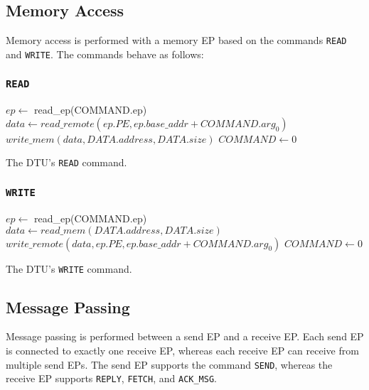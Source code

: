 \documentclass[a4paper,11pt,draft]{article}
\begin{document}
\subsection{Memory Access}

Memory access is performed with a memory EP based on the commands \texttt{READ} and \texttt{WRITE}. The commands behave as follows:

\subsubsection{\texttt{READ}}

\begin{algorithm}[H]
    $ep \gets$ read\_ep(COMMAND.ep)\;
    \BlankLine
    $data \gets read\_remote(ep.PE, ep.base\_addr + COMMAND.arg_0)$\;
    $write\_mem(data, DATA.address, DATA.size)$\;
    \BlankLine
    $COMMAND \gets 0$\;
    \caption{The DTU's \texttt{READ} command.}
\end{algorithm}

\subsubsection{\texttt{WRITE}}

\begin{algorithm}[H]
    $ep \gets$ read\_ep(COMMAND.ep)\;
    \BlankLine
    $data \gets read\_mem(DATA.address, DATA.size)$\;
    $write\_remote(data, ep.PE, ep.base\_addr + COMMAND.arg_0)$\;
    \BlankLine
    $COMMAND \gets 0$\;
    \caption{The DTU's \texttt{WRITE} command.}
\end{algorithm}

\subsection{Message Passing}

Message passing is performed between a send EP and a receive EP. Each send EP is connected to
exactly one receive EP, whereas each receive EP can receive from multiple send EPs. The send EP
supports the command \texttt{SEND}, whereas the receive EP supports \texttt{REPLY}, \texttt{FETCH},
and \texttt{ACK\_MSG}.
\end{document}
